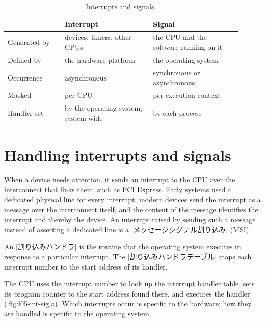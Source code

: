 \documentclass[../main.tex]{subfiles}
\begin{document}
\begin{table}[htbp]
  \centering
  \caption{Interrupts and signals.}
  \label{tab:l05-int-vs-sig}
  \small
  \begin{tabular}{@{}>{\raggedright\arraybackslash}p{0.22\linewidth}>{\raggedright\arraybackslash}p{0.345\linewidth}>{\raggedright\arraybackslash}p{0.345\linewidth}@{}}
    \toprule
    & Interrupt & Signal \\
    \midrule
    Generated by & devices, timers, other CPUs & the CPU and the software
      running on it \\
    Defined by   & the hardware platform & the operating system \\
    Occurrence   & asynchronous & synchronous or asynchronous \\
    Masked       & per CPU & per execution context \\
    Handler set  & by the operating system, system-wide & by each process
      \\
    \bottomrule
  \end{tabular}
\end{table}

\section{Handling interrupts and signals}
\label{sec:l05-handling}

When a device needs attention, it sends an interrupt to the CPU over the
interconnect that links them, such as PCI Express.  Early
systems used a dedicated physical line for every interrupt; modern devices
send the interrupt as a message over the interconnect itself, and the
content of the message identifies the interrupt and thereby the device.
An interrupt raised by sending such a message instead of asserting a
dedicated line is a
[メッセージシグナル割り込み]%
 (MSI).

\begin{definition}
  An [割り込みハンドラ] is the routine that the
  operating system executes in response to a particular interrupt.  The
  [割り込みハンドラテーブル] maps each
  interrupt number to the start address of its handler.
\end{definition}

The CPU uses the interrupt number to look up the interrupt handler table,
sets its program counter to the start address found there, and executes
the handler (\cref{fig:l05-int-sig}a).  Which interrupts occur is specific
to the hardware; how they are handled is specific to the operating
system.
\end{document}
